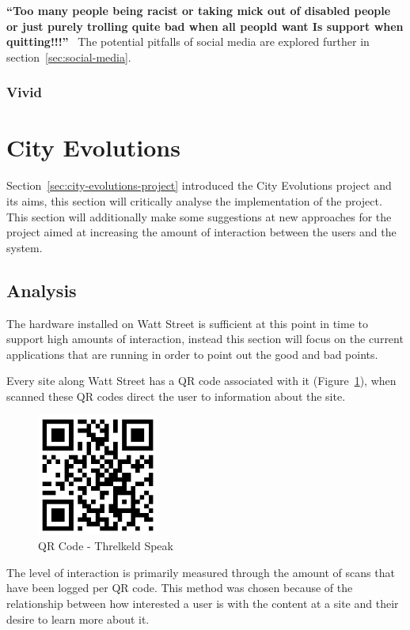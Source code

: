 \documentclass[a4paper,12pt]{article}
\begin{document}
\indent\textbf{``Too many people being racist or taking mick out of disabled people or just purely trolling quite bad when all peopld want Is support when quitting!!!''}~\citep{quitnow}
The potential pitfalls of social media are explored further in section~\ref{sec:social-media}.

\subsubsection{Vivid}


\newpage
\section{City Evolutions}
Section~\ref{sec:city-evolutions-project} introduced the City Evolutions project and its aims, this section will critically analyse the implementation of the project.
This section will additionally make some suggestions at new approaches for the project aimed at increasing the amount of interaction between the users and the system.

\subsection{Analysis}\label{sec:analysis}
The hardware installed on Watt Street is sufficient at this point in time to support high amounts of interaction, instead this section will focus on the current applications that are running in order to point out the good and bad points. 

\par
Every site along Watt Street has a QR code associated with it (Figure~\ref{QR-threkeld-barcode}), when scanned these QR codes direct the user to information about the site. 
\begin{figure}[ht!]
	\centering
	\includegraphics[width=40mm]{./images/qrcode-threlkeld}
	\caption{QR Code - Threlkeld Speak}
	\label{QR-threkeld-barcode}
\end{figure}
The level of interaction is primarily measured through the amount of scans that have been logged per QR code. 
This method was chosen because of the relationship between how interested a user is with the content at a site and their desire to learn more about it.
\end{document}
